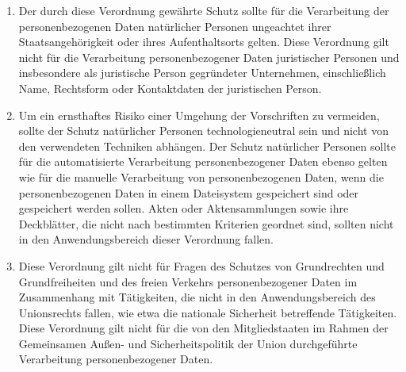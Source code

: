 \begin{enumerate}

   \item Der durch diese Verordnung gewährte Schutz sollte für die Verarbeitung der personenbezogenen Daten natürlicher
    Personen ungeachtet ihrer Staatsangehörigkeit oder ihres Aufenthaltsorts gelten. Diese Verordnung gilt nicht für
    die Verarbeitung personenbezogener Daten juristischer Personen und insbesondere als juristische Person gegründeter
    Unternehmen, einschließlich Name, Rechtsform oder Kontaktdaten der juristischen Person.%
   \label{itm:eg-14}
   

   \item Um ein ernsthaftes Risiko einer Umgehung der Vorschriften zu vermeiden, sollte der Schutz natürlicher Personen
    technologieneutral sein und nicht von den verwendeten Techniken abhängen. Der Schutz natürlicher Personen sollte
    für die automatisierte Verarbeitung personenbezogener Daten ebenso gelten wie für die manuelle Verarbeitung von
    personenbezogenen Daten, wenn die personenbezogenen Daten in einem Dateisystem gespeichert sind oder gespeichert
    werden sollen. Akten oder Aktensammlungen sowie ihre Deckblätter, die nicht nach bestimmten Kriterien geordnet
    sind, sollten nicht in den Anwendungsbereich dieser Verordnung fallen.%
   \label{itm:eg-15}
   

   \item Diese Verordnung gilt nicht für Fragen des Schutzes von Grundrechten und Grundfreiheiten und des freien
    Verkehrs personenbezogener Daten im Zusammenhang mit Tätigkeiten, die nicht in den Anwendungsbereich des
    Unionsrechts fallen, wie etwa die nationale Sicherheit betreffende Tätigkeiten. Diese Verordnung gilt nicht für die
    von den Mitgliedstaaten im Rahmen der Gemeinsamen Außen- und Sicherheitspolitik der Union durchgeführte
    Verarbeitung personenbezogener Daten.%
   \label{itm:eg-16}
   


\end{enumerate}
